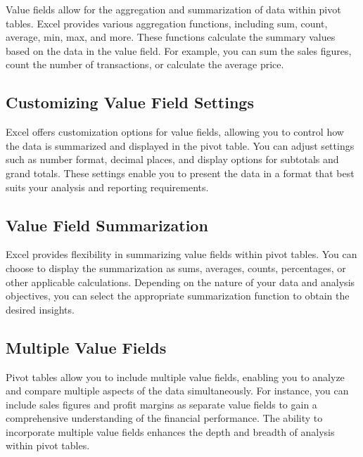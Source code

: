 \documentclass[
]{book}
\begin{document}
Value fields allow for the aggregation and summarization of data within pivot tables. Excel provides various aggregation functions, including sum, count, average, min, max, and more. These functions calculate the summary values based on the data in the value field. For example, you can sum the sales figures, count the number of transactions, or calculate the average price.

\hypertarget{customizing-value-field-settings}{%
\subsection{Customizing Value Field Settings}\label{customizing-value-field-settings}}

Excel offers customization options for value fields, allowing you to control how the data is summarized and displayed in the pivot table. You can adjust settings such as number format, decimal places, and display options for subtotals and grand totals. These settings enable you to present the data in a format that best suits your analysis and reporting requirements.

\hypertarget{value-field-summarization}{%
\subsection{Value Field Summarization}\label{value-field-summarization}}

Excel provides flexibility in summarizing value fields within pivot tables. You can choose to display the summarization as sums, averages, counts, percentages, or other applicable calculations. Depending on the nature of your data and analysis objectives, you can select the appropriate summarization function to obtain the desired insights.

\hypertarget{multiple-value-fields}{%
\subsection{Multiple Value Fields}\label{multiple-value-fields}}

Pivot tables allow you to include multiple value fields, enabling you to analyze and compare multiple aspects of the data simultaneously. For instance, you can include sales figures and profit margins as separate value fields to gain a comprehensive understanding of the financial performance. The ability to incorporate multiple value fields enhances the depth and breadth of analysis within pivot tables.
\end{document}
